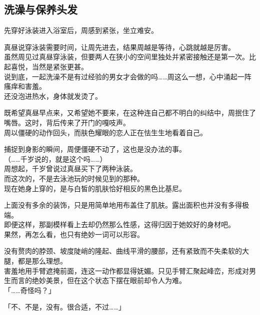 \subsection{洗澡与保养头发}

先穿好泳装进入浴室后，周感到紧张，坐立难安。

真昼说穿泳装需要时间，让周先进去，结果周越是等待，心跳就越是厉害。\\

虽然周见过真昼穿泳装，但要两人在狭小的空间里独处并紧密接触还是第一次。比起喜悦，当然是紧张更甚。\\

说到底，一起洗澡不是有过经验的男女才会做的吗……周这么一想，心中涌起一阵瘙痒和害羞。\\

还没泡进热水，身体就发烫了。

既希望真昼早点来，又希望她不要来，在这种连自己都不明白的纠结中，周抿住了嘴唇。这时，背后传来了开门的嘎吱声。\\

周以僵硬的动作回头，而肤色耀眼的恋人正在怯生生地看着自己。

捕捉到身影的瞬间，周便僵硬不动了，这也是没办法的事。\\

（……千岁说的，就是这个吗……）\\

周想起，千岁曾说过真昼买下了两种泳装。\\

而这次的，不是去泳池玩的时候见到的那种。\\

现在她身上穿的，是与白皙的肌肤恰好相反的黑色比基尼。

上面没有多余的装饰，只是用简单地用布盖住了肌肤。露出面积也并没有多得极端。\\

即便这样，那副模样看上去却仍然那么性感，这得归因于她姣好的身材吧。\\

果然，再怎么看，也只有绝妙一词可以形容。

没有赘肉的脖颈、坡度陡峭的隆起、曲线平滑的腰部，还有紧致而不失柔软的大腿，都是那么理想。\\

害羞地用手臂遮掩前面，连这一动作都显得妩媚。只见手臂汇聚起峰峦，形成对男生而言的绝妙美景，但在这个状态下摆在眼前却令人为难。\\

「……奇怪吗？」

「不、不是，没有。很合适，不过……」

